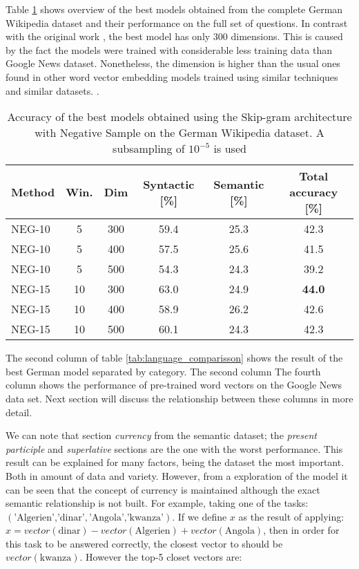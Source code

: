 Table \ref{tab:main_results} shows  overview of the best models obtained from
the complete German Wikipedia dataset  and their performance on the full set
of questions. In contrast with the original work
\cite{MikolovSCCD13} \cite{DBLP:journals/corr/abs-1301-3781}, the best model
has only 300 dimensions. This is caused by the fact the models were trained
with considerable less training data than Google News dataset. Nonetheless,
the dimension is higher than the usual ones found in other word vector embedding models
trained using similar techniques and similar datasets.\cite{Turian:2010:WRS:1858681.1858721} \cite{DBLP:journals/corr/abs-1103-0398}.

\begin{table}[h]
\centering

\caption{Accuracy of the best models obtained using the Skip-gram
  architecture with Negative Sample on the German Wikipedia dataset. A
  subsampling of $10^{-5}$ is used} 
\label{tab:main_results}




\small
\begin{tabular}{|l|c|c|cc|c|}
\hline
Method  &  Win.  &  Dim   &  Syntactic [\%] & Semantic
[\%] &  Total accuracy [\%]  \\
\hline

NEG-10  &   5  &  300  &  59.4  &  25.3  &  42.3  \\
 NEG-10  &   5  &  400  &  57.5  &  25.6  &  41.5  \\
 NEG-10  &   5  &  500  &  54.3  &  24.3  &  39.2  \\
 NEG-15  &  10  &  300  &  63.0  &  24.9  &  \textbf{44.0}  \\
 NEG-15  &  10  &  400  &  58.9  &  26.2  &  42.6  \\
 NEG-15  &  10  &  500  &  60.1  &  24.3  &  42.3  \\
\hline
\end{tabular}
\end{table}

The second column of table \ref{tab:language_comparisson} shows the result of
the best German model separated by category. The second column The fourth column
shows the performance of pre-trained word vectors on the Google News data
set. Next section will discuss the relationship between these columns in more detail.

We can note that section  \textit{currency} from
the semantic dataset; the \textit{present participle}  and 
\textit{superlative}  sections are the one with the  worst performance. This
result can be explained for many factors, being the dataset the most
important. Both in amount of data and variety. However, from a exploration of
the model it can be seen that the concept of currency is maintained although
the exact semantic relationship is not built.  For example, taking one of the
tasks:  $(\text{'Algerien','dinar'},\text{'Angola','kwanza'})$. If we define
$x$ as the result of applying:  $x = vector(\text{dinar}) -
vector(\text{Algerien}) + vector(\text{Angola})$, then in order for this task
to be answered correctly, the closest vector to should be $vector(\text{kwanza})$.
However the top-5 closet vectors are:



